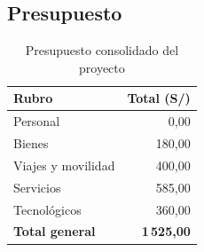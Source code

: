 \subsection{Presupuesto}

\begin{table}[H]
\centering
\caption{Presupuesto consolidado del proyecto}
\label{tab:presupuesto_consolidado}
\small
\begin{tabular}{lr}
\toprule
\textbf{Rubro} & \textbf{Total (S/)} \\
\midrule
Personal & 0,00 \\
Bienes & 180,00 \\
Viajes y movilidad & 400,00 \\
Servicios & 585,00 \\
Tecnológicos & 360,00 \\
\midrule
\textbf{Total general} & \textbf{1\,525,00} \\
\bottomrule
\end{tabular}
\end{table}
